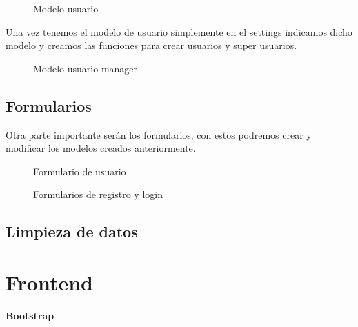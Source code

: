 \begin{figure}[H]
  \centering
  \noindent{}
  \caption{Modelo usuario}
\end{figure}

Una vez tenemos el modelo de usuario simplemente en el settings indicamos dicho modelo y creamos las funciones 
para crear usuarios y super usuarios.\\

\begin{figure}[H]
  \centering
  \noindent{}
  \caption{Modelo usuario manager}
\end{figure}

\subsection{Formularios}

Otra parte importante serán los formularios, con estos podremos crear y modificar los modelos creados anteriormente.

\begin{figure}[H]
  \centering
  \noindent{}
  \caption{Formulario de usuario}
\end{figure}

\begin{figure}[H]
  \centering
  \noindent{}
  \caption{Formularios de registro y login}
\end{figure}

\subsection{Limpieza de datos}


\section{Frontend}



\textbf{Bootstrap}



